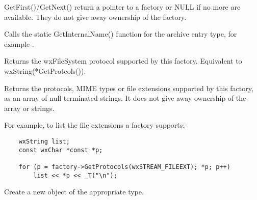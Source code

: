 GetFirst()/GetNext() return a pointer to a factory or NULL if no more
are available. They do not give away ownership of the factory.


\label{wxarchiveclassfactorygetinternalname}


Calls the static GetInternalName() function for the archive entry type,
for example
 .


\label{wxarchiveclassfactorygetprotocol}


Returns the wxFileSystem protocol supported by this factory. Equivalent
to wxString(*GetProtcols()).


\label{wxarchiveclassfactorygetprotocols}


Returns the protocols, MIME types or file extensions supported by this
factory, as an array of null terminated strings. It does not give away
ownership of the array or strings.

For example, to list the file extensions a factory supports:

\begin{verbatim}
    wxString list;
    const wxChar *const *p;

    for (p = factory->GetProtocols(wxSTREAM_FILEEXT); *p; p++)
        list << *p << _T("\n");

\end{verbatim}


\label{wxarchiveclassfactorynewentry}


Create a new  object of the
appropriate type.


\label{wxarchiveclassfactorynewstream}



